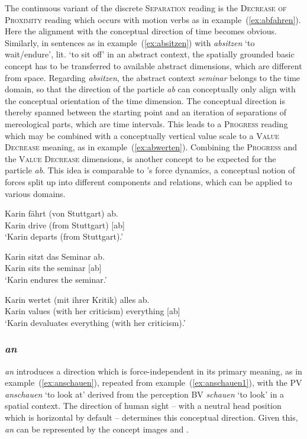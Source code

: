 \documentclass[output=paper]{langsci/langscibook}
\begin{document}
The continuous variant of the discrete \textsc{Separation} reading is
the \textsc{Decrease of Proximity} reading which occurs with motion
verbs as in example~(\ref{ex:abfahren}). Here the alignment with the
conceptual direction of time becomes obvious. Similarly, in sentences
as in example~(\ref{ex:absitzen}) with \textit{absitzen} `to
wait/endure', lit. `to sit off' in an abstract context, the spatially
grounded basic concept has to be transferred to available abstract
dimensions, which are different from space. Regarding
\textit{absitzen}, the abstract context \textit{seminar} belongs to
the time domain, so that the direction of the particle \textit{ab} can
conceptually only align with the conceptual orientation of the time
dimension. The conceptual direction is thereby spanned between the
starting point and an iteration of separations of mereological parts,
which are time intervals. This leads to a \textsc{Progress} reading
which may be combined with a conceptually vertical value scale
\citep{Tversky:11} to a \textsc{Value Decrease} meaning, as in
example~(\ref{ex:abwerten}). Combining the \textsc{Progress} and the
\textsc{Value Decrease} dimensions,  is another
concept to be expected for the particle \textit{ab}. This idea is
comparable to \cite{Talmy:00}'s force dynamics, a conceptual notion of
forces split up into different components and relations, which can be
applied to various domains.

\ea\label{ex:abfahren}
\gll Karin fährt (von Stuttgart) ab.\\
Karin drive (from Stuttgart) [ab]\\
\glt `Karin departs (from Stuttgart).'
\z
  
\ea\label{ex:absitzen}
\gll Karin sitzt das Seminar ab.\\
Karin sits the seminar [ab]\\
\glt `Karin endures the seminar.'
\z
  
\ea\label{ex:abwerten}
\gll Karin wertet (mit ihrer Kritik) alles ab.\\
Karin values (with her criticism) everything [ab]\\
\glt `Karin devaluates everything (with her criticism).'
\z

\vspace{+1mm}
\subsubsection{\textit{an}}

\textit{an} introduces a direction which is force-independent in its
primary meaning, as in example~(\ref{ex:anschauen}), repeated from
example~(\ref{ex:anschauen1}), with the PV \textit{anschauen} `to
look at' derived from the perception BV \textit{schauen} `to look'
in a spatial context. The direction of human sight -- with a neutral
head position which is horizontal by default -- determines this
conceptual direction. Given this, \textit{an} can be represented by
the concept images  and .
\end{document}
